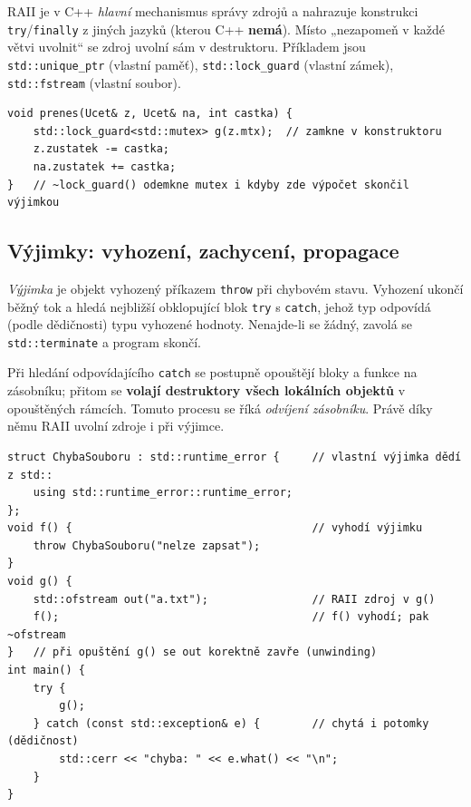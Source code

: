 \documentclass[11pt,a4paper]{article}
\newcommand{\cd}{\lstinline[style=cpp]}
\begin{document}
\begin{intuice}
RAII je v C++ \emph{hlavní} mechanismus správy zdrojů a nahrazuje konstrukci \texttt{try}/\texttt{finally} z jiných jazyků (kterou C++ \textbf{nemá}). Místo „nezapomeň v každé větvi uvolnit`` se zdroj uvolní sám v destruktoru. Příkladem jsou \cd{std::unique_ptr} (vlastní paměť), \cd{std::lock_guard} (vlastní zámek), \cd{std::fstream} (vlastní soubor).
\end{intuice}

\begin{lstlisting}[style=cpp]
void prenes(Ucet& z, Ucet& na, int castka) {
    std::lock_guard<std::mutex> g(z.mtx);  // zamkne v konstruktoru
    z.zustatek -= castka;
    na.zustatek += castka;
}   // ~lock_guard() odemkne mutex i kdyby zde výpočet skončil výjimkou
\end{lstlisting}

\subsection{Výjimky: vyhození, zachycení, propagace}

\begin{definice}
\emph{Výjimka} je objekt vyhozený příkazem \cd{throw} při chybovém stavu. Vyhození ukončí běžný tok a hledá nejbližší obklopující blok \cd{try} s \cd{catch}, jehož typ odpovídá (podle dědičnosti) typu vyhozené hodnoty. Nenajde-li se žádný, zavolá se \cd{std::terminate} a program skončí.
\end{definice}

\begin{definice}
Při hledání odpovídajícího \cd{catch} se postupně opouštějí bloky a funkce na zásobníku; přitom se \textbf{volají destruktory všech lokálních objektů} v opouštěných rámcích. Tomuto procesu se říká \emph{odvíjení zásobníku}. Právě díky němu RAII uvolní zdroje i při výjimce.
\end{definice}

\begin{lstlisting}[style=cpp]
struct ChybaSouboru : std::runtime_error {     // vlastní výjimka dědí z std::
    using std::runtime_error::runtime_error;
};
void f() {                                     // vyhodí výjimku
    throw ChybaSouboru("nelze zapsat");
}
void g() {
    std::ofstream out("a.txt");                // RAII zdroj v g()
    f();                                       // f() vyhodí; pak ~ofstream
}   // při opuštění g() se out korektně zavře (unwinding)
int main() {
    try {
        g();
    } catch (const std::exception& e) {        // chytá i potomky (dědičnost)
        std::cerr << "chyba: " << e.what() << "\n";
    }
}
\end{lstlisting}
\end{document}
